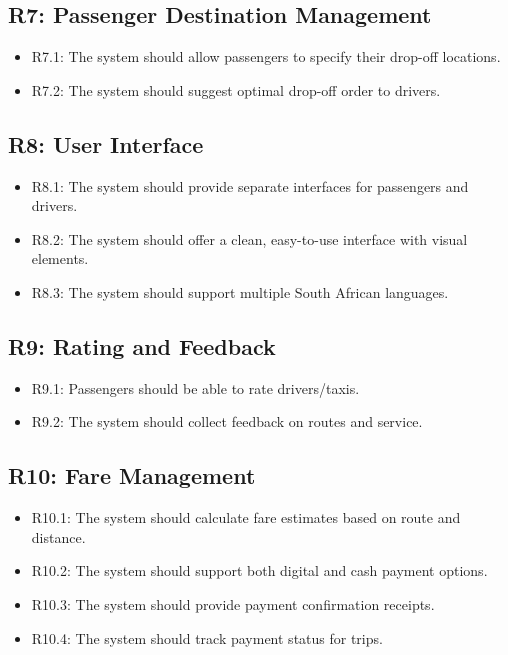 \documentclass[a4paper,12pt]{article}
\begin{document}
\subsection*{R7: Passenger Destination Management}
\begin{itemize}
    \item R7.1: The system should allow passengers to specify their drop-off locations.
    \item R7.2: The system should suggest optimal drop-off order to drivers.
\end{itemize}

\subsection*{R8: User Interface}
\begin{itemize}
    \item R8.1: The system should provide separate interfaces for passengers and drivers.
    \item R8.2: The system should offer a clean, easy-to-use interface with visual elements.
    \item R8.3: The system should support multiple South African languages. 
\end{itemize}

\subsection*{R9: Rating and Feedback}
\begin{itemize}
    \item R9.1: Passengers should be able to rate drivers/taxis.
    \item R9.2: The system should collect feedback on routes and service.
\end{itemize}

\subsection*{R10: Fare Management}
\begin{itemize}
    \item R10.1: The system should calculate fare estimates based on route and distance.
    \item R10.2: The system should support both digital and cash payment options.
    \item R10.3: The system should provide payment confirmation receipts.
    \item R10.4: The system should track payment status for trips.
\end{itemize}
\end{document}
